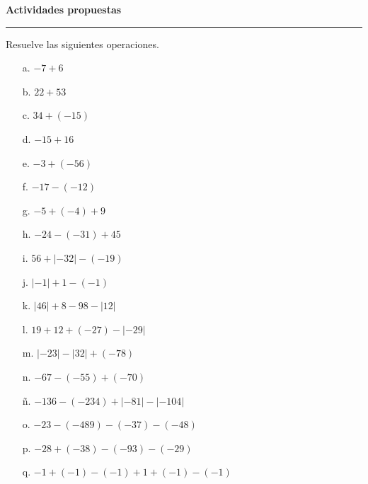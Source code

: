 \documentclass[spanish,letterpaper, 11pt, addpoints, answers]{exam}
\begin{document}
\begin{questions}
\begin{itemize}
  \end{itemize}
  
  \parbox{6in}{
  \textbf{Actividades propuestas}}
  \vspace{0.15in}
  \hrule 


\question Resuelve las siguientes operaciones.

\begin{multicols}{2}
  


\begin{itemize}
  \item[a.] $-7+6$
  \vspace{1cm}
  \item[b.] $22+53$
  \vspace{1cm}
  \item[c.] $34+(-15)$
  \vspace{1cm}
  \item[d.] $-15+16$
  \vspace{1cm}
  \item[e.] $-3+(-56)$
  \vspace{1cm}
  \item[f.] $-17-(-12)$
  \vspace{1cm}
  \item[g.] $-5+(-4)+9$
  \vspace{1cm}
  \item[h.] $-24-(-31)+45$
  \vspace{1cm}
  \item[i.] $56+|-32|-(-19)$
  \vspace{1cm}
  \item[j.] $|-1|+1-(-1)$
  \vspace{1cm}
  \item[k.] $|46|+8-98-|12|$
  \vspace{1cm}
  \item[l.] $19+12+(-27)-|-29|$
  \vspace{1cm}
  \item[m.] $|-23|-|32|+(-78)$
  \vspace{1cm}
  \item[n.] $-67-(-55)+(-70)$
  \vspace{1cm}
  \item[ñ.] $-136-(-234)+|-81|-|-104|$
  \vspace{1cm}
  \item[o.] $-23-(-489)-(-37)-(-48)$
  \vspace{1cm}
  \item[p.] $-28+(-38)-(-93)-(-29)$
  \vspace{1cm}
  \item[q.] $-1+(-1)-(-1)+1+(-1)-(-1)$             
\end{itemize}


\end{multicols}
\end{questions}
\end{document}
